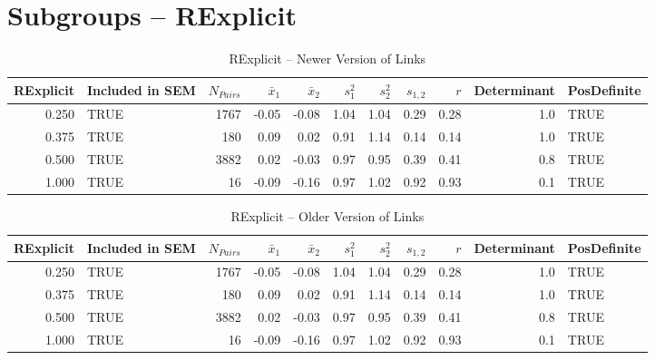 \documentclass{article}\usepackage[]{graphicx}\usepackage[]{color}
\begin{document}
\section{Subgroups --  RExplicit }%
\begin{table}[ht]
\centering
\begin{tabular}{rlrrrrrrrrl}
  \hline
RExplicit & Included in SEM & $N_{Pairs}$ & $\bar{x}_1$ & $\bar{x}_2$ & $s_1^2$ & $s_2^2$ & $s_{1,2}$ & $r$ & Determinant & PosDefinite \\ 
  \hline
0.250 & TRUE & 1767 & -0.05 & -0.08 & 1.04 & 1.04 & 0.29 & 0.28 & 1.0 & TRUE \\ 
  0.375 & TRUE & 180 & 0.09 & 0.02 & 0.91 & 1.14 & 0.14 & 0.14 & 1.0 & TRUE \\ 
  0.500 & TRUE & 3882 & 0.02 & -0.03 & 0.97 & 0.95 & 0.39 & 0.41 & 0.8 & TRUE \\ 
  1.000 & TRUE & 16 & -0.09 & -0.16 & 0.97 & 1.02 & 0.92 & 0.93 & 0.1 & TRUE \\ 
   \hline
\end{tabular}
\caption{RExplicit -- Newer Version of Links} 
\end{table}
\begin{table}[ht]
\centering
\begin{tabular}{rlrrrrrrrrl}
  \hline
RExplicit & Included in SEM & $N_{Pairs}$ & $\bar{x}_1$ & $\bar{x}_2$ & $s_1^2$ & $s_2^2$ & $s_{1,2}$ & $r$ & Determinant & PosDefinite \\ 
  \hline
0.250 & TRUE & 1767 & -0.05 & -0.08 & 1.04 & 1.04 & 0.29 & 0.28 & 1.0 & TRUE \\ 
  0.375 & TRUE & 180 & 0.09 & 0.02 & 0.91 & 1.14 & 0.14 & 0.14 & 1.0 & TRUE \\ 
  0.500 & TRUE & 3882 & 0.02 & -0.03 & 0.97 & 0.95 & 0.39 & 0.41 & 0.8 & TRUE \\ 
  1.000 & TRUE & 16 & -0.09 & -0.16 & 0.97 & 1.02 & 0.92 & 0.93 & 0.1 & TRUE \\ 
   \hline
\end{tabular}
\caption{RExplicit -- Older Version of Links} 
\end{table}
\newpage 
\end{document}
